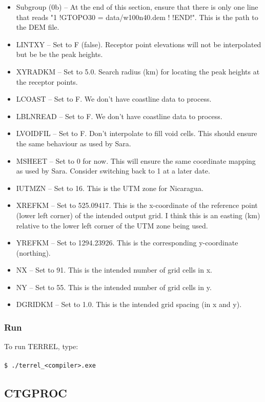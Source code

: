 \documentclass[10pt,a4paper]{article}
\newcommand\tab[1][0.5cm]{\hspace*{#1}}
\begin{document}
\begin{itemize}
\begin{itemize}
\item Subgroup (0b) -- At the end of this section, ensure that there is only one line that reads "1 !GTOPO30 = data/w100n40.dem !     !END!". This is the path to the DEM file.
\item LINTXY -- Set to F (false). Receptor point elevations will not be interpolated but be be the peak heights.
\item XYRADKM -- Set to 5.0. Search radius (km) for locating the peak heights at the receptor points.
\item LCOAST -- Set to F. We don't have coastline data to process.
\item LBLNREAD -- Set to F. We don't have coastline data to process.
\item LVOIDFIL -- Set to F. Don't interpolate to fill void cells. This should ensure the same behaviour as used by Sara.
\item MSHEET -- Set to 0 for now. This will ensure the same coordinate mapping as used by Sara. Consider switching back to 1 at a later date.
\item IUTMZN -- Set to 16. This is the UTM zone for Nicaragua.
\item XREFKM -- Set to 525.09417. This is the x-coordinate of the reference point (lower left corner) of the intended output grid. I think this is an easting (km) relative to the lower left corner of the UTM zone being used.
\item YREFKM -- Set to 1294.23926. This is the corresponding y-coordinate (northing).
\item NX -- Set to 91. This is the intended number of grid cells in x.
\item NY -- Set to 55. This is the intended number of grid cells in y.
\item DGRIDKM -- Set to 1.0. This is the intended grid spacing (in x and y).
\end{itemize}
\end{itemize}
\subsubsection{Run}
To run TERREL, type:\\\\
\tab \texttt{\$ ./terrel\_<compiler>.exe}

\subsection{CTGPROC}
\end{document}
